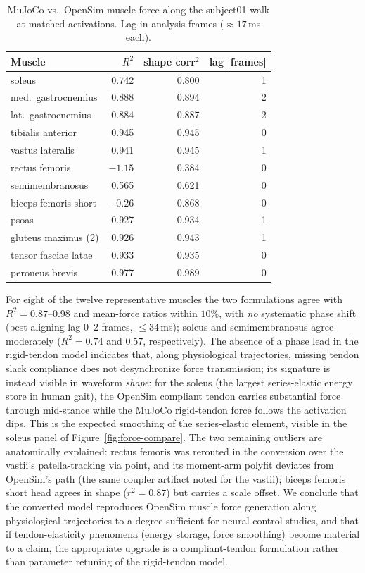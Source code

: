 \begin{table}[h]
  \centering
  \caption{MuJoCo vs.\ OpenSim muscle force along the subject01 walk at
  matched activations. Lag in analysis frames ($\approx 17$\,ms each).}
  \label{tab:force-r2}
  \small
  \begin{tabular}{lrrr}
    \toprule
    Muscle & $R^2$ & shape corr$^2$ & lag [frames] \\
    \midrule
    soleus   & 0.742 & 0.800 & 1 \\
    med.\ gastrocnemius & 0.888 & 0.894 & 2 \\
    lat.\ gastrocnemius & 0.884 & 0.887 & 2 \\
    tibialis anterior & 0.945 & 0.945 & 0 \\
    vastus lateralis & 0.941 & 0.945 & 1 \\
    rectus femoris & $-1.15$ & 0.384 & 0 \\
    semimembranosus & 0.565 & 0.621 & 0 \\
    biceps femoris short & $-0.26$ & 0.868 & 0 \\
    psoas & 0.927 & 0.934 & 1 \\
    gluteus maximus (2) & 0.926 & 0.943 & 1 \\
    tensor fasciae latae & 0.933 & 0.935 & 0 \\
    peroneus brevis & 0.977 & 0.989 & 0 \\
    \bottomrule
  \end{tabular}
\end{table}

For eight of the twelve representative muscles the two formulations
agree with $R^2 = 0.87$--$0.98$ and mean-force ratios within $10\%$,
with \emph{no} systematic phase shift (best-aligning lag 0--2 frames,
$\le 34$\,ms); soleus and semimembranosus agree moderately
($R^2 = 0.74$ and $0.57$, respectively). The absence of a phase lead in
the rigid-tendon model indicates that, along physiological
trajectories, missing tendon slack compliance does not desynchronize
force transmission; its signature is instead visible in waveform
\emph{shape}: for the soleus (the largest series-elastic energy store
in human gait), the OpenSim compliant tendon carries substantial force
through mid-stance while the MuJoCo rigid-tendon force follows the
activation dips. This is the expected smoothing of the series-elastic
element, visible in the soleus panel of Figure~\ref{fig:force-compare}.
The two remaining outliers are anatomically explained: rectus femoris
was rerouted in the conversion over the vastii's patella-tracking via
point, and its moment-arm polyfit deviates from OpenSim's path (the
same coupler artifact noted for the vastii); biceps femoris short head
agrees in shape ($r^2 = 0.87$) but carries a scale offset. We conclude that the
converted model reproduces OpenSim muscle force generation along
physiological trajectories to a degree sufficient for neural-control
studies, and that if tendon-elasticity phenomena (energy storage,
force smoothing) become material to a claim, the appropriate upgrade
is a compliant-tendon formulation rather than parameter retuning of
the rigid-tendon model.

